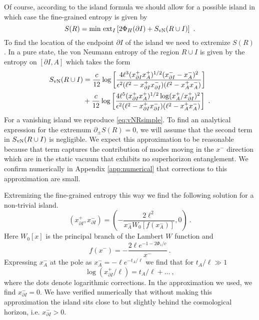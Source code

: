 \documentclass[a4paper,11pt]{article}
\newcommand{\beq}{\begin{equation}}
\newcommand{\eeq}{\end{equation}}
\newcommand{\bal}{\begin{aligned}}
\newcommand{\eal}{\end{aligned}}
\numberwithin{equation}{section}
\begin{document}
Of course, according to the island formula we should allow for a possible island in which case the fine-grained entropy is given by
\beq \label{eq:IslandFormula}
S(R) = \text{min ext}_I\left[2\Phi_H(\partial I) + S_{\rm vN}(R\cup I) \right]~.
\eeq
To find the location of the endpoint $\partial I$ of the island we need to extremize $S(R)$. In a pure state, the von Neumann entropy of the region $R\cup I$ is given by the entropy on $[\partial I,A]$ which takes the form
\beq
\bal
S_{\rm vN}(R\cup I) &= \frac c{12}\log\left[\frac{4\ell^3(x^+_{\partial I}x^+_{A})^{1/2}(x_{\partial I}^--x_{A}^-)^2}{\epsilon^2(\ell^2-x_{\partial I}^+x_{\partial I}^-)(\ell^2-x_{A}^+x_{A}^-)}\right]
\\&+\frac c{12}\log\left[\frac{4\ell^5(x^+_{\partial I}x^+_{A})^{1/2}\log(x_A^+/x_{\partial I}^+)^2}{\epsilon^2(\ell^2-x_{\partial I}^+x_{\partial I}^-)(\ell^2-x_{A}^+x_{A}^-)}\right] ~.
\eal
\eeq
For a vanishing island we reproduce \eqref{eq:vNRsimple}. To find an analytical expression for the extremum $\partial_\pm S(R)=0$, we will assume that the second term in $S_{\rm vN}(R\cup I)$ is negligible. We expect this approximation to be reasonable because that term captures the contribution of modes moving in the $x^-$ direction which are in the static vacuum that exhibits no superhorizon entanglement. We confirm numerically in  Appendix \ref{app:numerical} that corrections to this approximation are small. 

Extremizing the fine-grained entropy this way we find the following solution for a non-trivial island.
\beq \label{eq:IslandLoc}
(x_{\partial I}^+,x_{\partial I}^-) = \left(-\frac{2\ell^2}{x_A^-W_0\left[f(x_A^-)\right]},0\right) ~.
\eeq
Here $W_0[x]$ is the principal branch of the Lambert $W$ function and
\beq
f(x^-)=-\frac{2\ell e^{-1-2\Phi_s/c}}{x^-} ~.
\eeq
Expressing $x_A^-$ at the pole as $x_A^-=-\ell e^{-t_A/\ell}$ we find that for $t_A/\ell \gg 1$
\beq
\log(x_{\partial I}^+/\ell) = t_A/\ell + \dots ~,
\eeq
where the dots denote logarithmic corrections. In the approximation we used, we find $x^{-}_{\partial I}=0$. We have verified numerically that without making this approximation the island sits close to but slightly behind the cosmological horizon, i.e. $x^{-}_{\partial I}>0$.
\end{document}
